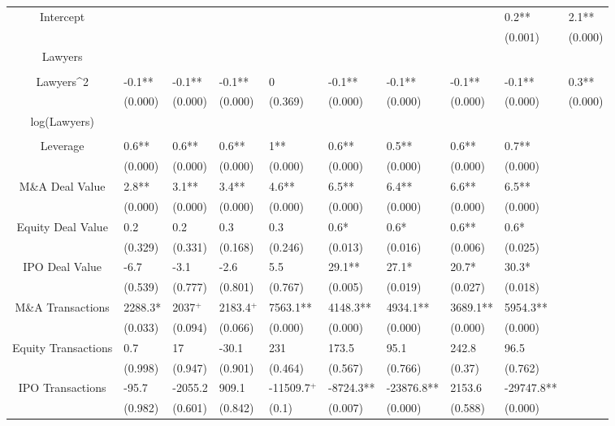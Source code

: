 \documentclass{article}
\begin{document}
\begin{table}[H]
\begin{tabular}{|clllllllll|}
Intercept &  &  &  &  &  &  &  & 0.2** & 2.1** \\ 
   &  &  &  &  &  &  &  & (0.001) & (0.000) \\ 
  Lawyers &  &  &  &  &  &  &  &  &  \\ 
   &  &  &  &  &  &  &  &  &  \\ 
  Lawyers^2 & -0.1** & -0.1** & -0.1** & 0 & -0.1** & -0.1** & -0.1** & -0.1** & 0.3** \\ 
   & (0.000) & (0.000) & (0.000) & (0.369) & (0.000) & (0.000) & (0.000) & (0.000) & (0.000) \\ 
  log(Lawyers) &  &  &  &  &  &  &  &  &  \\ 
   &  &  &  &  &  &  &  &  &  \\ 
  Leverage & 0.6** & 0.6** & 0.6** & 1** & 0.6** & 0.5** & 0.6** & 0.7** &  \\ 
   & (0.000) & (0.000) & (0.000) & (0.000) & (0.000) & (0.000) & (0.000) & (0.000) &  \\ 
  M\&A Deal Value & 2.8** & 3.1** & 3.4** & 4.6** & 6.5** & 6.4** & 6.6** & 6.5** &  \\ 
   & (0.000) & (0.000) & (0.000) & (0.000) & (0.000) & (0.000) & (0.000) & (0.000) &  \\ 
  Equity Deal Value & 0.2 & 0.2 & 0.3 & 0.3 & 0.6* & 0.6* & 0.6** & 0.6* &  \\ 
   & (0.329) & (0.331) & (0.168) & (0.246) & (0.013) & (0.016) & (0.006) & (0.025) &  \\ 
  IPO Deal Value & -6.7 & -3.1 & -2.6 & 5.5 & 29.1** & 27.1* & 20.7* & 30.3* &  \\ 
   & (0.539) & (0.777) & (0.801) & (0.767) & (0.005) & (0.019) & (0.027) & (0.018) &  \\ 
  M\&A Transactions & 2288.3* & 2037$^{+}$ & 2183.4$^{+}$ & 7563.1** & 4148.3** & 4934.1** & 3689.1** & 5954.3** &  \\ 
   & (0.033) & (0.094) & (0.066) & (0.000) & (0.000) & (0.000) & (0.000) & (0.000) &  \\ 
  Equity Transactions & 0.7 & 17 & -30.1 & 231 & 173.5 & 95.1 & 242.8 & 96.5 &  \\ 
   & (0.998) & (0.947) & (0.901) & (0.464) & (0.567) & (0.766) & (0.37) & (0.762) &  \\ 
  IPO Transactions & -95.7 & -2055.2 & 909.1 & -11509.7$^{+}$ & -8724.3** & -23876.8** & 2153.6 & -29747.8** &  \\ 
   & (0.982) & (0.601) & (0.842) & (0.1) & (0.007) & (0.000) & (0.588) & (0.000) &  \\ 

\end{tabular}
\end{table}
\end{document}
